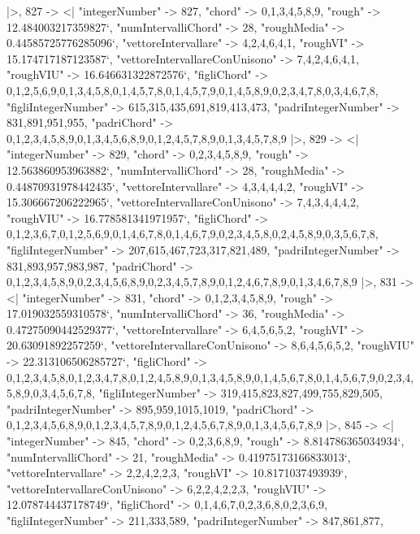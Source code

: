 \documentclass[
]{article}
\begin{document}
\begin{DatasetVerbatim}
  |>,
  827 -> <|
    "integerNumber" -> 827,
    "chord" -> {0,1,3,4,5,8,9},
    "rough" -> 12.484003217359827`,
    "numIntervalliChord" -> 28,
    "roughMedia" -> 0.44585725776285096`,
    "vettoreIntervallare" -> {4,2,4,6,4,1},
    "roughVI" -> 15.174717187123587`,
    "vettoreIntervallareConUnisono" -> {7,4,2,4,6,4,1},
    "roughVIU" -> 16.646631322872576`,
    "figliChord" -> {{0,1,2,5,6,9},{0,1,3,4,5,8},{0,1,4,5,7,8},{0,1,4,5,7,9},{0,1,4,5,8,9},{0,2,3,4,7,8},{0,3,4,6,7,8}},
    "figliIntegerNumber" -> {615,315,435,691,819,413,473},
    "padriIntegerNumber" -> {831,891,951,955},
    "padriChord" -> {{0,1,2,3,4,5,8,9},{0,1,3,4,5,6,8,9},{0,1,2,4,5,7,8,9},{0,1,3,4,5,7,8,9}}
  |>,
  829 -> <|
    "integerNumber" -> 829,
    "chord" -> {0,2,3,4,5,8,9},
    "rough" -> 12.563860953963882`,
    "numIntervalliChord" -> 28,
    "roughMedia" -> 0.44870931978442435`,
    "vettoreIntervallare" -> {4,3,4,4,4,2},
    "roughVI" -> 15.306667206222965`,
    "vettoreIntervallareConUnisono" -> {7,4,3,4,4,4,2},
    "roughVIU" -> 16.778581341971957`,
    "figliChord" -> {{0,1,2,3,6,7},{0,1,2,5,6,9},{0,1,4,6,7,8},{0,1,4,6,7,9},{0,2,3,4,5,8},{0,2,4,5,8,9},{0,3,5,6,7,8}},
    "figliIntegerNumber" -> {207,615,467,723,317,821,489},
    "padriIntegerNumber" -> {831,893,957,983,987},
    "padriChord" -> {{0,1,2,3,4,5,8,9},{0,2,3,4,5,6,8,9},{0,2,3,4,5,7,8,9},{0,1,2,4,6,7,8,9},{0,1,3,4,6,7,8,9}}
  |>,
  831 -> <|
    "integerNumber" -> 831,
    "chord" -> {0,1,2,3,4,5,8,9},
    "rough" -> 17.019032559310578`,
    "numIntervalliChord" -> 36,
    "roughMedia" -> 0.47275090442529377`,
    "vettoreIntervallare" -> {6,4,5,6,5,2},
    "roughVI" -> 20.63091892257259`,
    "vettoreIntervallareConUnisono" -> {8,6,4,5,6,5,2},
    "roughVIU" -> 22.313106506285727`,
    "figliChord" -> {{0,1,2,3,4,5,8},{0,1,2,3,4,7,8},{0,1,2,4,5,8,9},{0,1,3,4,5,8,9},{0,1,4,5,6,7,8},{0,1,4,5,6,7,9},{0,2,3,4,5,8,9},{0,3,4,5,6,7,8}},
    "figliIntegerNumber" -> {319,415,823,827,499,755,829,505},
    "padriIntegerNumber" -> {895,959,1015,1019},
    "padriChord" -> {{0,1,2,3,4,5,6,8,9},{0,1,2,3,4,5,7,8,9},{0,1,2,4,5,6,7,8,9},{0,1,3,4,5,6,7,8,9}}
  |>,
  845 -> <|
    "integerNumber" -> 845,
    "chord" -> {0,2,3,6,8,9},
    "rough" -> 8.814786365034934`,
    "numIntervalliChord" -> 21,
    "roughMedia" -> 0.41975173166833013`,
    "vettoreIntervallare" -> {2,2,4,2,2,3},
    "roughVI" -> 10.8171037493939`,
    "vettoreIntervallareConUnisono" -> {6,2,2,4,2,2,3},
    "roughVIU" -> 12.078744437178749`,
    "figliChord" -> {{0,1,4,6,7},{0,2,3,6,8},{0,2,3,6,9}},
    "figliIntegerNumber" -> {211,333,589},
    "padriIntegerNumber" -> {847,861,877},

\end{DatasetVerbatim}
\end{document}
